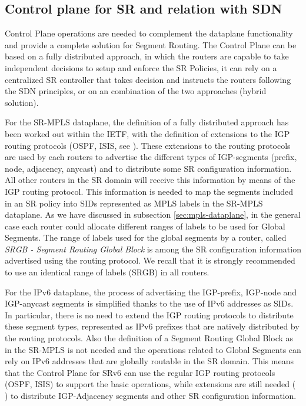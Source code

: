 

\subsection{Control plane for SR and relation with SDN}
\label{sec:sr_control_plane}

Control Plane operations are needed to complement the dataplane functionality and provide a complete solution for Segment Routing. The Control Plane can be based on a fully distributed approach, in which the routers are capable to take independent decisions to setup and enforce the SR Policies, it can rely on a centralized SR controller that takes decision and instructs the routers following the SDN principles, or on an combination of the two approaches (hybrid solution). 

For the SR-MPLS dataplane, the definition of a fully distributed approach has been worked out within the IETF, with the definition of extensions to the IGP routing protocols (OSPF, ISIS, see \cite{ietf-ospf-segment-routing-extensions} \cite{ietf-ospf-ospfv3-segment-routing-extensions} \cite{ietf-isis-segment-routing-extensions}). 
These extensions to the routing protocols are used by each routers to advertise the different types of IGP-segments (prefix, node, adjacency, anycast) and to distribute some SR configuration information. All other routers in the SR domain will receive this information by means of the IGP routing protocol. This information is needed to map the segments included in an SR policy into SIDs represented as MPLS labels in the SR-MPLS dataplane. As we have discussed in subsection \ref{sec:mpls-dataplane}, in the general case each router could allocate different ranges of labels to be used for Global Segments. The range of labels used for the global segments by a router, called \textit{SRGB - Segment Routing Global Block} is among the SR configuration information advertised using the routing protocol. We recall that it is strongly recommended to use an identical range of labels (SRGB) in all routers. 

For the IPv6 dataplane, the process of advertising the IGP-prefix, IGP-node and IGP-anycast segments is simplified thanks to the use of IPv6 addresses as SIDs. In particular, there is no need to extend the IGP routing protocols to distribute these segment types, represented as IPv6 prefixes that are natively distributed by the routing protocols. Also the definition of a Segment Routing Global Block as in the SR-MPLS is not needed and the operations related to Global Segments can rely on IPv6 addresses that are globally routable in the SR domain. This means that the Control Plane for SRv6 can use the regular IGP routing protocols (OSPF, ISIS) to support the basic operations, while extensions are still needed (\cite{bashandy-isis-srv6-extensions} \cite{li-ospf-ospfv3-srv6-extensions}) to distribute IGP-Adjacency segments and other SR configuration information. 

